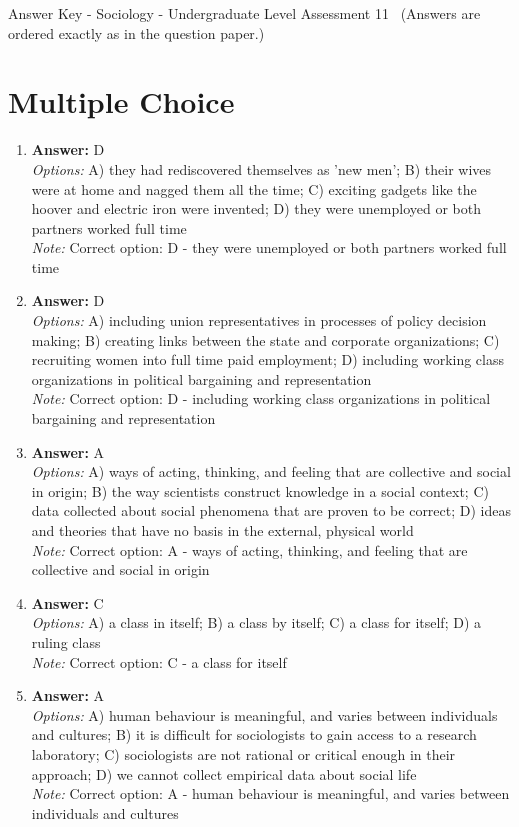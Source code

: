 \documentclass[12pt]{article}
\begin{document}
\begin{center}
Answer Key - Sociology - Undergraduate Level Assessment 11 \
\small (Answers are ordered exactly as in the question paper.)
\end{center}

\section*{Multiple Choice}
\begin{enumerate}[label=\arabic*.]
\item \textbf{Answer:} D
\\ \textit{Options:} A) they had rediscovered themselves as 'new men'; B) their wives were at home and nagged them all the time; C) exciting gadgets like the hoover and electric iron were invented; D) they were unemployed or both partners worked full time
\\ \textit{Note:} Correct option: D - they were unemployed or both partners worked full time
\item \textbf{Answer:} D
\\ \textit{Options:} A) including union representatives in processes of policy decision making; B) creating links between the state and corporate organizations; C) recruiting women into full time paid employment; D) including working class organizations in political bargaining and representation
\\ \textit{Note:} Correct option: D - including working class organizations in political bargaining and representation
\item \textbf{Answer:} A
\\ \textit{Options:} A) ways of acting, thinking, and feeling that are collective and social in origin; B) the way scientists construct knowledge in a social context; C) data collected about social phenomena that are proven to be correct; D) ideas and theories that have no basis in the external, physical world
\\ \textit{Note:} Correct option: A - ways of acting, thinking, and feeling that are collective and social in origin
\item \textbf{Answer:} C
\\ \textit{Options:} A) a class in itself; B) a class by itself; C) a class for itself; D) a ruling class
\\ \textit{Note:} Correct option: C - a class for itself
\item \textbf{Answer:} A
\\ \textit{Options:} A) human behaviour is meaningful, and varies between individuals and cultures; B) it is difficult for sociologists to gain access to a research laboratory; C) sociologists are not rational or critical enough in their approach; D) we cannot collect empirical data about social life
\\ \textit{Note:} Correct option: A - human behaviour is meaningful, and varies between individuals and cultures
\end{enumerate}
\end{document}
